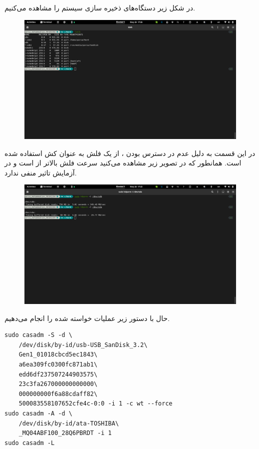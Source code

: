 \documentclass{article}
\begin{document}
در شکل زیر دستگاه‌های ذخیره‌ سازی سیستم را مشاهده می‌کنیم.

\begin{figure}[H]
    \centering
    \includegraphics[width=\textwidth]{images/3-c-storage.png}
\end{figure}

در این قسمت به دلیل عدم در دسترس بودن 
،
از یک فلش به عنوان کش استفاده شده است.
همانطور که در تصویر زیر مشاهده می‌کنید سرعت فلش بالاتر از 
است و در آزمایش تاثیر منفی ندارد.

\begin{figure}[H]
    \centering
    \includegraphics[width=\textwidth]{images/3-c-speed.png}
\end{figure}

حال با دستور زیر عملیات خواسته شده را انجام می‌دهیم.

\begin{latin}
\begin{lstlisting}
sudo casadm -S -d \
    /dev/disk/by-id/usb-USB_SanDisk_3.2\
    Gen1_01018cbcd5ec1843\
    a6ea309fc0300fc871ab1\
    edd6df237507244903575\
    23c3fa267000000000000\
    000000000f6a88cdaff82\
    500083558107652cfe4c-0:0 -i 1 -c wt --force
sudo casadm -A -d \
    /dev/disk/by-id/ata-TOSHIBA\
    _MQ04ABF100_28Q6PBRDT -i 1
sudo casadm -L
\end{lstlisting}
\end{latin}
\end{document}
